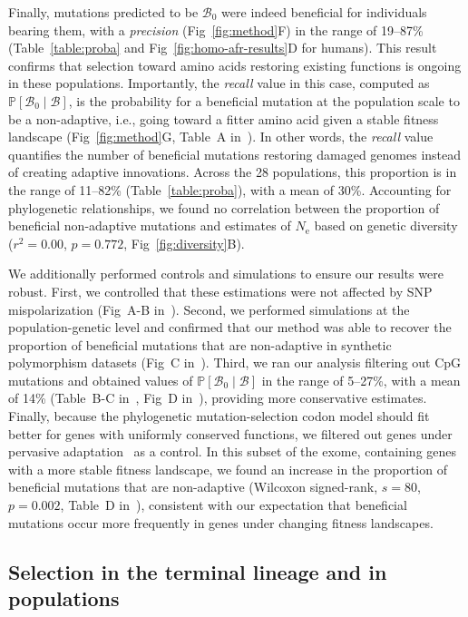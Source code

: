 \documentclass[10pt,letterpaper]{article}
\newcommand{\Ne}{N_{\text{e}}}
\newcommand{\proba}{\mathbb{P}}
\newcommand{\SphyBen}{\mathcal{B}_0}
\newcommand{\given}{\mid}
\newcommand{\SpopBen}{\mathcal{B}}
\begin{document}
Finally, mutations predicted to be $\SphyBen$ were indeed beneficial for individuals bearing them, with a \textit{precision} (Fig~\ref{fig:method}F) in the range of 19--87\% (Table~\ref{table:proba} and Fig~\ref{fig:homo-afr-results}D for humans).
This result confirms that selection toward amino acids restoring existing functions is ongoing in these populations.
Importantly, the \textit{recall} value in this case, computed as $\proba [ \SphyBen \given \SpopBen]$, is the probability for a beneficial mutation at the population scale to be a non-adaptive, i.e., going toward a fitter amino acid given a stable fitness landscape (Fig~\ref{fig:method}G, Table~A in~).
In other words, the \textit{recall} value quantifies the number of beneficial mutations restoring damaged genomes instead of creating adaptive innovations.
Across the 28 populations, this proportion is in the range of 11--82\% (Table~\ref{table:proba}), with a mean of 30\%.
Accounting for phylogenetic relationships, we found no correlation between the proportion of beneficial non-adaptive mutations and estimates of $\Ne$ based on genetic diversity ($r^2=0.00$, $p=0.772$, Fig~\ref{fig:diversity}B).

We additionally performed controls and simulations to ensure our results were robust.
First, we controlled that these estimations were not affected by SNP mispolarization (Fig~A-B in~).
Second, we performed simulations at the population-genetic level and confirmed that our method was able to recover the proportion of beneficial mutations that are non-adaptive in synthetic polymorphism datasets (Fig~C in~).
Third, we ran our analysis filtering out CpG mutations and obtained values of $\proba [ \SphyBen \given \SpopBen]$ in the range of 5--27\%, with a mean of 14\% (Table~B-C in~, Fig~D in~), providing more conservative estimates.
Finally, because the phylogenetic mutation-selection codon model should fit better for genes with uniformly conserved functions, we filtered out genes under pervasive adaptation~\cite{latrille_genes_2023} as a control.
In this subset of the exome, containing genes with a more stable fitness landscape, we found an increase in the proportion of beneficial mutations that are non-adaptive (Wilcoxon signed-rank, $s=80$, $p=0.002$, Table~D in~), consistent with our expectation that beneficial mutations occur more frequently in genes under changing fitness landscapes.

\subsection*{Selection in the terminal lineage and in populations}
\end{document}
